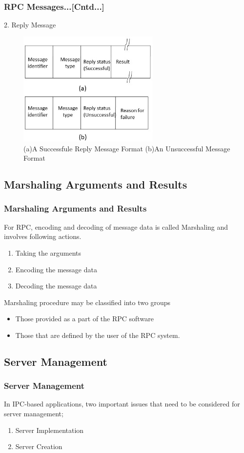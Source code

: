 \documentclass{beamer}
\begin{document}
\begin{frame}
	\frametitle{RPC Messages...[Cntd...]}
	\vspace{0.5cm}
	2. Reply Message\\
	\begin{figure}
		\centering
		\includegraphics[width=7cm]{fig44.jpg}
		\caption{(a)A Successfule Reply Message Format (b)An Unsuccessful Message Format}
	\end{figure}
\end{frame}


\subsection{Marshaling Arguments and Results}
\begin{frame}
	\frametitle{Marshaling Arguments and Results}
	For RPC, encoding and decoding of message data is called Marshaling and involves following actions.
	\begin{enumerate}
		\item Taking the arguments
		\item Encoding the message data
		\item Decoding the message data
	\end{enumerate}
	\vspace{0.5cm}
	Marshaling procedure may be classified into two groups
	\begin{itemize}
		\item Those provided as a part of the RPC software
		\item Those that are defined by the user of the RPC system.
	\end{itemize}
	\vspace{2cm}
\end{frame}

\subsection{Server Management}
\begin{frame}
	\frametitle{Server Management}
	In IPC-based  applications, two important issues that need to be considered for server management; 
	\vspace{0.5cm}
	\begin{enumerate}
		\item Server Implementation
		\item Server Creation
	\end{enumerate}
	\vspace{5cm}
\end{frame}
\end{document}
